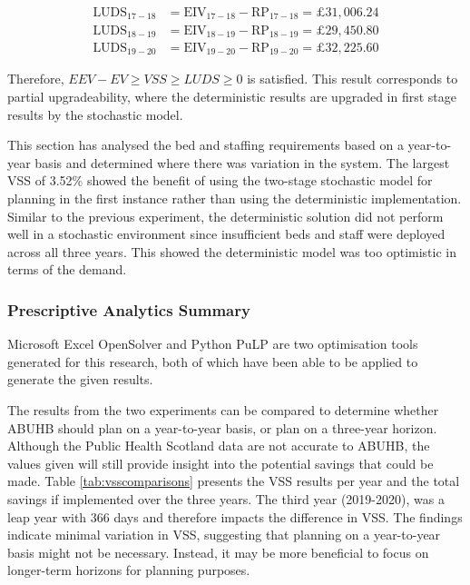 \documentclass[../thesis.tex]{subfiles}
\begin{document}
\begin{align}
    \text{LUDS}_{17-18} &= \text{EIV}_{17-18} - \text{RP}_{17-18} = \pounds31,006.24 \\
    \text{LUDS}_{18-19} &= \text{EIV}_{18-19} - \text{RP}_{18-19} = \pounds29,450.80  \\
    \text{LUDS}_{19-20} &= \text{EIV}_{19-20} - \text{RP}_{19-20} = \pounds32,225.60
\end{align}

Therefore, $EEV-EV \geq VSS \geq LUDS \geq 0$ is satisfied. This result corresponds to partial upgradeability, where the deterministic results are upgraded in first stage results by the stochastic model.

This section has analysed the bed and staffing requirements based on a year-to-year basis and determined where there was variation in the system. The largest VSS of 3.52\% showed the benefit of using the two-stage stochastic model for planning in the first instance rather than using the deterministic implementation. Similar to the previous experiment, the deterministic solution did not perform well in a stochastic environment since insufficient beds and staff were deployed across all three years. This showed the deterministic model was too optimistic in terms of the demand.

\subsubsection{Prescriptive Analytics Summary}
Microsoft Excel OpenSolver and Python PuLP are two optimisation tools generated for this research, both of which have been able to be applied to generate the given results.

The results from the two experiments can be compared to determine whether ABUHB should plan on a year-to-year basis, or plan on a three-year horizon. Although the Public Health Scotland data are not accurate to ABUHB, the values given will still provide insight into the potential savings that could be made. Table \ref{tab:vsscomparisons} presents the VSS results per year and the total savings if implemented over the three years. The third year (2019-2020), was a leap year with 366 days and therefore impacts the difference in VSS. 
The findings indicate minimal variation in VSS, suggesting that planning on a year-to-year basis might not be necessary. Instead, it may be more beneficial to focus on longer-term horizons for planning purposes.
\end{document}
